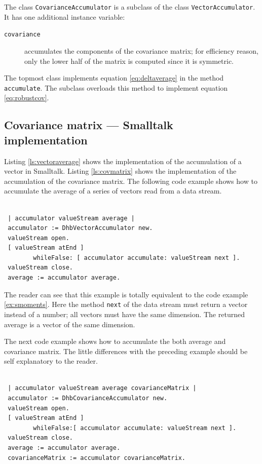 \documentclass[twoside]{book}
\begin{document}
\noindent The class {\tt CovarianceAccumulator} is a subclass of
the class {\tt VectorAccumulator}. It has one additional instance
variable: {} {\parskip 0pt
\begin{description}
  \item[\tt covariance] accumulates the components of the covariance
  matrix; for efficiency reason, only the lower half of the matrix
  is computed since it is symmetric.
\end{description}
}

The topmost class implements equation \ref{eq:deltaverage} in the
method {\tt accumulate}. The subclass overloads this method to
implement equation \ref{eq:robustcov}.

\subsection{Covariance matrix --- Smalltalk implementation}
\label{sec:scovmatrix} Listing \ref{ls:vectoraverage} shows the
implementation of the accumulation of a vector in Smalltalk.
Listing \ref{ls:covmatrix} shows the implementation of the
accumulation of the covariance matrix. The following code example
shows how to accumulate the average of a series of vectors read
from a data stream.
\begin{codeExample}
\begin{verbatim}

 | accumulator valueStream average |
 accumulator := DhbVectorAccumulator new.
 valueStream open.
 [ valueStream atEnd ]
        whileFalse: [ accumulator accumulate: valueStream next ].
 valueStream close.
 average := accumulator average.
\end{verbatim}
\end{codeExample}
The reader can see that this example is totally equivalent to the
code example \ref{ex:smoments}. Here the method {\tt next} of the
data stream must return a vector instead of a number; all vectors
must have the same dimension. The returned average is a vector of
the same dimension.

The next code example shows how to accumulate the both average and
covariance matrix. The little differences with the preceding
example should be self explanatory to the reader.
\begin{codeExample}
\begin{verbatim}

 | accumulator valueStream average covarianceMatrix |
 accumulator := DhbCovarianceAccumulator new.
 valueStream open.
 [ valueStream atEnd ]
        whileFalse:[ accumulator accumulate: valueStream next ].
 valueStream close.
 average := accumulator average.
 covarianceMatrix := accumulator covarianceMatrix.
\end{verbatim}
\end{codeExample}
\end{document}
